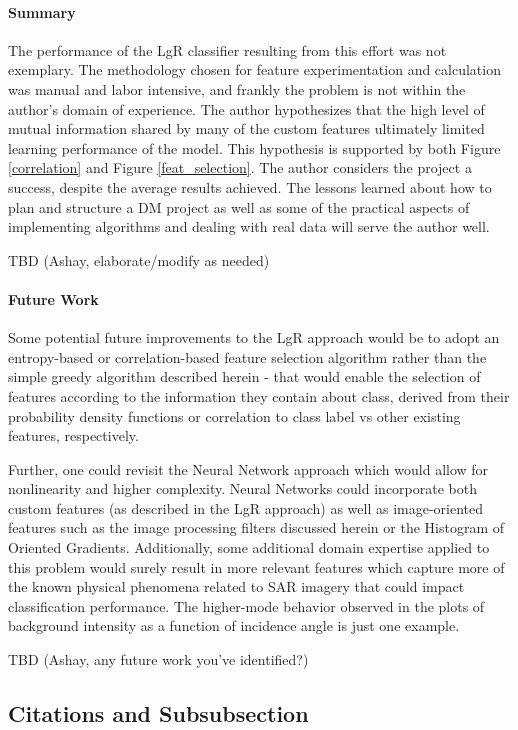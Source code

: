 \documentclass[fleqn,10pt]{SelfArx} %
\begin{document}
\paragraph{Summary}
The performance of the LgR classifier resulting from this effort was not exemplary.  The methodology chosen for feature experimentation and calculation was manual and labor intensive, and frankly the problem is not within the author's domain of experience.  The author hypothesizes that the high level of mutual information shared by many of the custom features ultimately limited learning performance of the model.  This hypothesis is supported by both Figure \ref{correlation} and Figure \ref{feat_selection}.  The author considers the project a success, despite the average results achieved.  The lessons learned about how to plan and structure a DM project as well as some of the practical aspects of implementing algorithms and dealing with real data will serve the author well.

TBD (Ashay, elaborate/modify as needed)

\paragraph{Future Work}
Some potential future improvements to the LgR approach would be to adopt an entropy-based or correlation-based feature selection algorithm rather than the simple greedy algorithm described herein - that would enable the selection of features according to the information they contain about class, derived from their probability density functions or correlation to class label vs other existing features, respectively.  

Further, one could revisit the Neural Network approach which would allow for nonlinearity and higher complexity.  Neural Networks could incorporate both custom features (as described in the LgR approach) as well as image-oriented features such as the image processing filters discussed herein or the Histogram of Oriented Gradients.  Additionally, some additional domain expertise applied to this problem would surely result in more relevant features which capture more of the known physical phenomena related to SAR imagery that could impact classification performance.  The higher-mode behavior observed in the plots of background intensity as a function of incidence angle is just one example.

TBD (Ashay, any future work you've identified?)

\subsection{Citations and Subsubsection}
\end{document}
